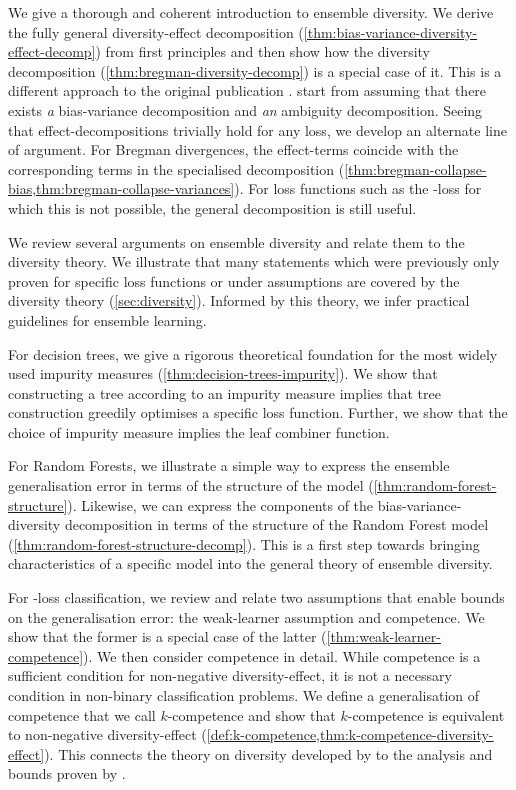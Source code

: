 \documentclass[
	twoside=false, %
]{kaobook}
\begin{document}
We give a thorough and coherent introduction to ensemble diversity. We derive the fully general diversity-{effect} decomposition (\cf \ref{thm:bias-variance-diversity-effect-decomp}) from first principles and then show how the diversity decomposition (\cf \ref{thm:bregman-diversity-decomp}) is a special case of it. This is a different approach to the original publication \cite{wood_UnifiedTheoryDiversity_2023}. \citeauthor{wood_UnifiedTheoryDiversity_2023} start from assuming that there exists \textit{a} bias-variance decomposition and \textit{an} ambiguity decomposition.
Seeing that effect-decompositions trivially hold for any loss, we develop an alternate line of argument.
For Bregman divergences, the effect-terms coincide with the corresponding terms in the specialised decomposition (\cf \cref{thm:bregman-collapse-bias,thm:bregman-collapse-variances}). For loss functions such as the \zeroone-loss for which this is not possible, the general decomposition is still useful.

We review several arguments on ensemble diversity and relate them to the diversity theory. We illustrate that many statements which were previously only proven for specific loss functions or under assumptions are covered by the diversity theory (\cf \cref{sec:diversity}). Informed by this theory, we infer practical guidelines for ensemble learning.

For decision trees, we give a rigorous theoretical foundation for the most widely used impurity measures (\cf \ref{thm:decision-trees-impurity}).  We show that constructing a tree according to an impurity measure implies that tree construction greedily optimises a specific loss function. Further, we show that the choice of impurity measure implies the leaf combiner function.

For Random Forests, we illustrate a simple way to express the ensemble generalisation error in terms of the structure of the model (\cf \ref{thm:random-forest-structure}). Likewise, we can express the components of the bias-variance-diversity decomposition in terms of the structure of the Random Forest model (\cf \ref{thm:random-forest-structure-decomp}). This is a first step towards bringing characteristics of a specific model into the general theory of ensemble diversity. 

For \zeroone-loss classification, we review and relate two assumptions that enable bounds on the generalisation error: the weak-learner assumption and competence. We show that the former is a special case of the latter (\cf \ref{thm:weak-learner-competence}). We then consider competence in detail. While competence is a sufficient condition for non-negative diversity-effect, it is not a necessary condition in non-binary classification problems. We define a generalisation of competence that we call $k$-competence and show that $k$-competence is equivalent to non-negative diversity-effect (\cf \cref{def:k-competence,thm:k-competence-diversity-effect}). This connects the theory on diversity developed by \citeauthor{wood_UnifiedTheoryDiversity_2023} \cite{wood_UnifiedTheoryDiversity_2023} to the analysis and bounds proven by \citeauthor{theisen_WhenAreEnsembles_2023} \cite{theisen_WhenAreEnsembles_2023}.
\end{document}
